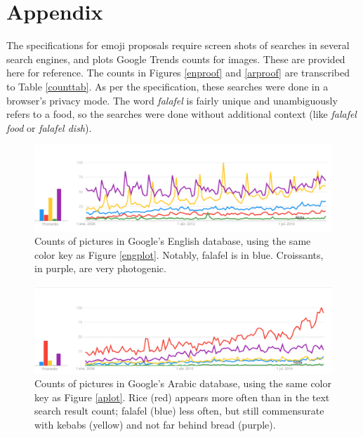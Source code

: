 \documentclass[a4paper,10pt]{article}
\begin{document}
\eject
\section*{Appendix}
The specifications for emoji proposals require screen shots of searches in several
search engines, and plots Google Trends counts for images. These are provided here
for reference. The counts in Figures \ref{enproof} and \ref{arproof} are transcribed
to Table \ref{counttab}. As per the specification, these searches were done
in a browser's privacy mode. The word {\em falafel} is fairly unique and unambiguously
refers to a food, so the searches were done without additional context (like {\em
falafel food} or {\em falafel dish}).


\begin{figure}[!hb]
\begin{center}
\includegraphics[width=4.8in]{etrends-pics.png}
\end{center}
\caption{Counts of pictures in Google's English database, using the same color key as
Figure \ref{engplot}. Notably, falafel is in blue. Croissants, in purple, are very photogenic.}
\label{engpicplot}
\end{figure}


\begin{figure}[!hb]
\begin{center}
\includegraphics[width=4.8in]{atrends-pics.png}
\end{center}
\caption{Counts of pictures in Google's Arabic database, using the same color key as Figure \ref{aplot}. Rice (red) appears more often than in
the text search result count; falafel (blue) less often, but still commensurate with kebabs (yellow) and not far behind bread (purple).}
\label{apicplot}
\end{figure}
\end{document}
